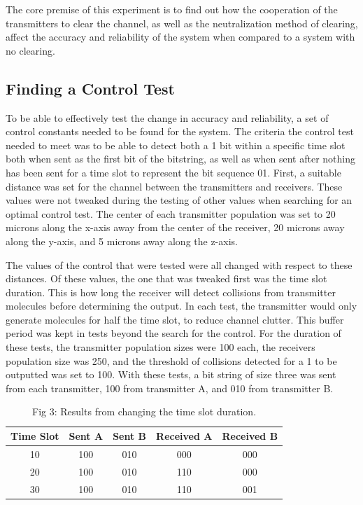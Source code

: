 \documentclass[conference]{IEEEtran}
\begin{document}
The core premise of this experiment is to find out how the cooperation of the transmitters to clear the channel, as well as the neutralization method of clearing, affect the accuracy and reliability of the system when compared to a system with no clearing.

\subsection{Finding a Control Test}

To be able to effectively test the change in accuracy and reliability, a set of control constants needed to be found for the system. The criteria the control test needed to meet was to be able to detect both a 1 bit within a specific time slot both when sent as the first bit of the bitstring, as well as when sent after nothing has been sent for a time slot to represent the bit sequence 01. First, a suitable distance was set for the channel between the transmitters and receivers. These values were not tweaked during the testing of other values when searching for an optimal control test. The center of each transmitter population was set to 20 microns along the x-axis away from the center of the receiver, 20 microns away along the y-axis, and 5 microns away along the z-axis. 
\\
\par
The values of the control that were tested were all changed with respect to these distances. Of these values, the one that was tweaked first was the time slot duration. This is how long the receiver will detect collisions from transmitter molecules before determining the output. In each test, the transmitter would only generate molecules for half the time slot, to reduce channel clutter. This buffer period was kept in tests beyond the search for the control. For the duration of these tests, the transmitter population sizes were 100 each, the receivers population size was 250, and the threshold of collisions detected for a 1 to be outputted was set to 100. With these tests, a bit string of size three was sent from each transmitter, 100 from transmitter A, and 010 from transmitter B.

\begin{table}[htbp]
\begin{center}
\begin{tabular}{|c|c|c|c|c|}
\hline
Time Slot & Sent A & Sent B & Received A & Received B\\\hline
10 & 100 & 010 & 000 & 000\\\hline
20 & 100 & 010 & 110 & 000\\\hline
30 & 100 & 010 & 110 & 001\\\hline
\end{tabular}
\end{center}
\caption{Fig 3: Results from changing the time slot duration.}
\end{table}
\end{document}
